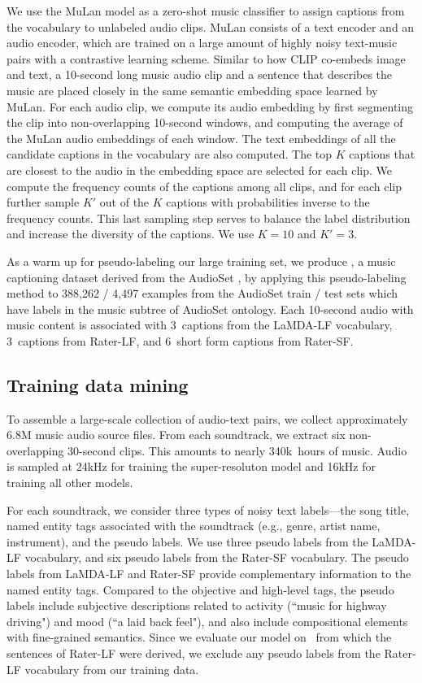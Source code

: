 We use the MuLan model as a zero-shot music classifier to assign captions from the vocabulary to unlabeled audio clips.
MuLan consists of a text encoder and an audio encoder, which are trained on a large amount of highly noisy text-music pairs with a contrastive learning scheme. Similar to how CLIP \cite{radford2021learning} co-embeds image and text, a 10-second long music audio clip and a sentence that describes the music are placed closely in the same semantic embedding space learned by MuLan.
For each audio clip, we compute its audio embedding by first segmenting the clip into non-overlapping 10-second windows, and computing the average of the MuLan audio embeddings of each window. The text embeddings of all the candidate captions in the vocabulary are also computed. The top $K$ captions that are closest to the audio in the embedding space are selected for each clip.  
We compute the frequency counts of the captions among all clips, and for each clip further sample $K'$ out of the $K$ captions with probabilities inverse to the frequency counts.
This last sampling step serves to balance the label distribution and increase the diversity of the captions. We use $K=10$ and $K'=3$.

As a warm up for pseudo-labeling our large training set, we produce \MusicCap, a music captioning dataset derived from the AudioSet \cite{gemmeke2017audio}, by applying this pseudo-labeling method to 388,262 / 4,497 examples from the AudioSet train / test sets which have labels in the music subtree of AudioSet ontology. Each 10-second audio with music content is associated with 3~captions from the LaMDA-LF vocabulary, 3~captions from Rater-LF, and 6~short form captions from Rater-SF. 

\subsection{Training data mining}
To assemble a large-scale collection of audio-text pairs, we collect approximately 6.8M {music audio source files.}
From each {soundtrack}, we extract six non-overlapping 30-second clips. This amounts to nearly 340k~hours of music. Audio is sampled at 24kHz for training the super-resoluton model and 16kHz for training all other models.

For each {soundtrack}, we consider three types of noisy text labels---the song title, named entity tags associated with the {soundtrack} (e.g., genre, artist name, instrument), and the pseudo labels. We use three pseudo labels from the LaMDA-LF vocabulary, and six pseudo labels from the Rater-SF vocabulary.
The pseudo labels from LaMDA-LF and Rater-SF provide complementary information to the named entity tags. Compared to the objective and high-level tags, the pseudo labels include subjective descriptions related to activity (``music for highway driving") and mood (``a laid back feel"), and also include compositional elements with fine-grained semantics. 
Since we evaluate our model on \EvalSet~from which the sentences of Rater-LF were derived, we exclude any pseudo labels from the Rater-LF vocabulary from our training data.

